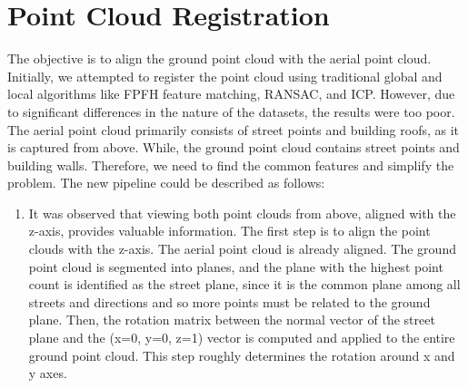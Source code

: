 \documentclass[11pt]{article}
\begin{document}
    \section{Point Cloud Registration}
    The objective is to align the ground point cloud with the aerial point cloud. Initially, we attempted
    to register the point cloud using traditional global and local algorithms like FPFH feature matching,
    RANSAC, and ICP. However, due to significant differences in the nature of the datasets, the results were
    too poor. The aerial point cloud primarily consists of street points and building roofs, as it is captured
    from above. While, the ground point cloud contains street points and building walls. Therefore, we need to
    find the common features and simplify the problem. The new pipeline could be described as follows:
    \begin{enumerate}
        \item It was observed that viewing both point clouds from above, aligned with the z-axis, provides
        valuable information. The first step is to align the point clouds with the z-axis. The aerial
        point cloud is already aligned. The ground point cloud is segmented into planes, and the plane
        with the highest point count is identified as the street plane, since it is the common plane among
        all streets and directions and so more points must be related to the ground plane. Then,
        the rotation matrix between the normal vector of the street plane and the (x=0, y=0, z=1) vector
        is computed and applied to the entire ground point cloud. This step roughly determines the rotation
        around x and y axes.


\end{enumerate}
\end{document}
